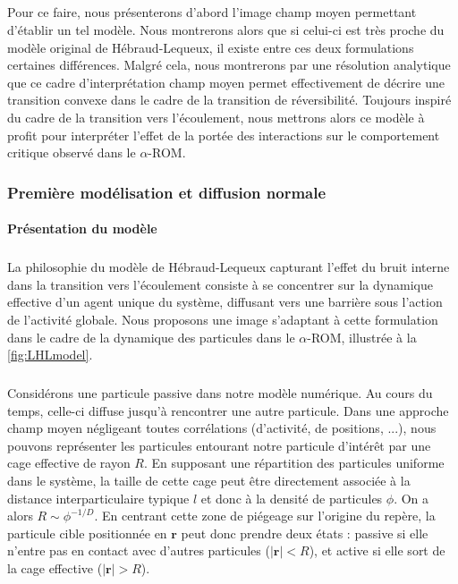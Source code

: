 \subparagraph{}Pour ce faire, nous présenterons d'abord l'image champ moyen permettant d'établir un tel modèle. Nous montrerons alors que si celui-ci est très proche du modèle original de Hébraud-Lequeux, il existe entre ces deux formulations certaines différences. Malgré cela, nous montrerons par une résolution analytique que ce cadre d'interprétation champ moyen permet effectivement de décrire une transition convexe dans le cadre de la transition de réversibilité. Toujours inspiré du cadre de la transition vers l'écoulement, nous mettrons alors ce modèle à profit pour interpréter l'effet de la portée des interactions sur le comportement critique observé dans le $\alpha$-ROM.

\subsubsection{Première modélisation et diffusion normale}

\label{sec:diffnorm}

\paragraph{Présentation du modèle}

\subparagraph{}La philosophie du modèle de Hébraud-Lequeux capturant l'effet du bruit interne dans la transition vers l'écoulement consiste à se concentrer sur la dynamique effective d'un agent unique du système, diffusant vers une barrière sous l'action de l'activité globale. Nous proposons une image s'adaptant à cette formulation dans le cadre de la dynamique des particules dans le $\alpha$-ROM, illustrée à la \autoref{fig:LHLmodel}.

\subparagraph{}Considérons une particule passive dans notre modèle numérique. Au cours du temps, celle-ci diffuse jusqu'à rencontrer une autre particule. Dans une approche champ moyen négligeant toutes corrélations  (d'activité, de positions, ...), nous pouvons représenter les particules entourant notre particule d'intérêt par une cage effective de rayon $R$. En supposant une répartition des particules uniforme dans le système, la taille de cette cage peut être directement associée à la distance interparticulaire typique $l$ et donc à la densité de particules $\phi$. On a alors $R\sim \phi^{-1/D}$. En centrant cette zone de piégeage sur l'origine du repère, la particule cible positionnée en $\mathbf{r}$ peut donc prendre deux états : passive si elle n'entre pas en contact avec d'autres particules ($|\mathbf{r}|<R$), et active si elle sort de la cage effective ($|\mathbf{r}|>R$). 

